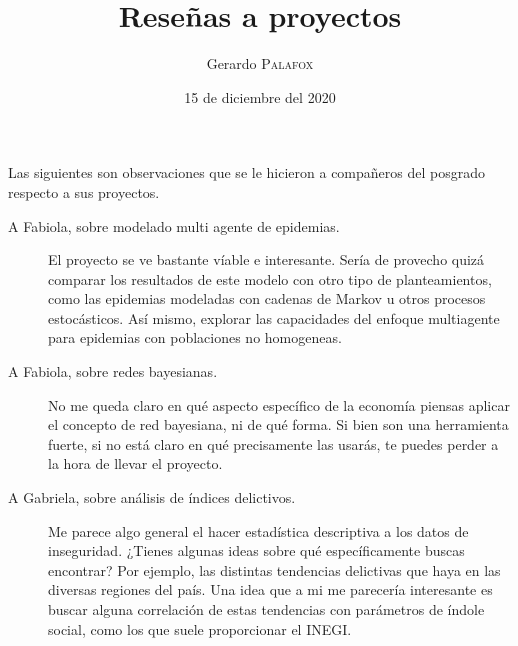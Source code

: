 \documentclass[letterpaper, 10 pt, conference]{article}
\title{Reseñas a proyectos
}
\date{15 de diciembre del 2020}
\author{Gerardo {\textsc{Palafox}}}
\begin{document}
\maketitle

Las siguientes son observaciones que se le hicieron a compañeros del posgrado respecto a sus proyectos. 

\begin{description}
	\item[A Fabiola, sobre modelado multi agente de epidemias.] El proyecto se ve bastante víable e interesante. Sería de provecho quizá comparar los resultados de este modelo con otro tipo de planteamientos, como las epidemias modeladas con cadenas de Markov u otros procesos estocásticos. Así mismo, explorar las capacidades del enfoque multiagente para epidemias con poblaciones no homogeneas.
	
	\item[A Fabiola, sobre redes bayesianas.] No me queda claro en qué aspecto específico de la economía piensas aplicar el concepto de red bayesiana, ni de qué forma. Si bien son una herramienta fuerte, si no está claro en qué precisamente las usarás, te puedes perder a la hora de llevar el proyecto. 
	
	\item[A Gabriela, sobre análisis de índices delictivos.] Me parece algo general el hacer estadística descriptiva a los datos de inseguridad. ¿Tienes algunas ideas sobre qué específicamente buscas encontrar? Por ejemplo, las distintas tendencias delictivas que haya en las diversas regiones del país. Una idea que a mi me parecería  interesante es buscar alguna correlación de estas tendencias con parámetros de índole social, como los que suele proporcionar el INEGI.
	
\end{description}

\end{document}
